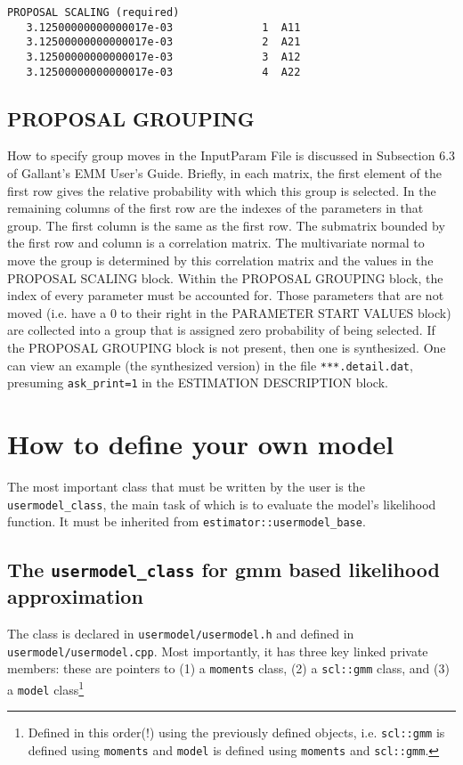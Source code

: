 \documentclass[11pt, letterpaper, notitlepage]{article}
\begin{document}
\begin{verbatim}
PROPOSAL SCALING (required)
   3.12500000000000017e-03              1  A11
   3.12500000000000017e-03              2  A21
   3.12500000000000017e-03              3  A12
   3.12500000000000017e-03              4  A22
\end{verbatim}

\subsection{PROPOSAL GROUPING}


How to specify group moves in the InputParam File is discussed in Subsection $6.3$ of Gallant's EMM User's Guide. Briefly, in each matrix, the first element of the first row gives the relative probability with which this group is selected. In the remaining columns of the first row are the indexes of the parameters in that group. The first column is the same as the first row. The submatrix bounded by the first row and column is a correlation matrix. The multivariate normal to move the group is determined by this correlation matrix and the values in the PROPOSAL SCALING block. Within the PROPOSAL GROUPING block, the index of every parameter must be accounted for. Those parameters that are not moved (i.e. have a $0$ to their right in the PARAMETER START VALUES
block) are collected into a group that is assigned zero probability of being selected. If the PROPOSAL GROUPING block is not present, then one is synthesized. One can view an example (the synthesized version) in the
file \texttt{***.detail.dat}, presuming \texttt{ask\_print=1} in the ESTIMATION DESCRIPTION block.

\pagebreak

\section{How to define your own model}

The most important class that must be written by the user is the \texttt{usermodel\_class}, the main task of which is to evaluate the model's likelihood function. It must be inherited from \texttt{estimator::usermodel\_base}. 

\subsection{The \texttt{usermodel\_class} for gmm based likelihood approximation}

The class is declared in \texttt{usermodel/usermodel.h} and defined in \texttt{usermodel/usermodel.cpp}. Most importantly, it has three key linked private members: these are pointers to (1) a \texttt{moments} class, (2) a \texttt{scl::gmm} class, and (3) a \texttt{model} class\footnote{Defined in this order(!) using the previously defined objects, i.e. \texttt{scl::gmm} is defined using \texttt{moments} and \texttt{model} is defined using \texttt{moments} and \texttt{scl::gmm}.}
\end{document}
